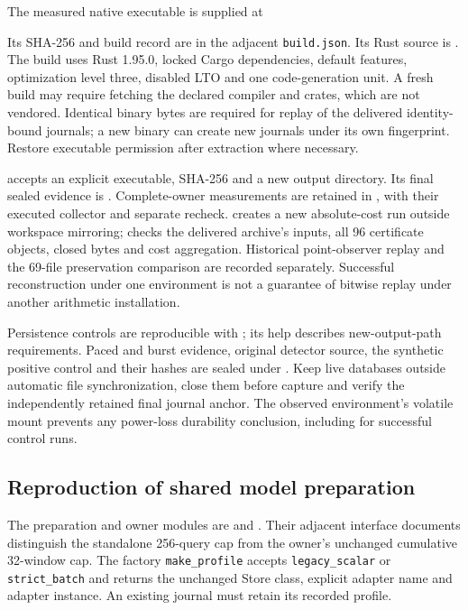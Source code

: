 \documentclass[11pt,a4paper]{article}
\theoremstyle{definition}\newtheorem{definition}[theorem]{Definition}
\begin{document}
The measured native executable is supplied at
\begin{quote}\raggedright\footnotesize
{}
\end{quote}
Its SHA-256 and build record are in the adjacent \texttt{build.json}. Its Rust source is . The build uses Rust 1.95.0, locked Cargo dependencies, default features, optimization level three, disabled LTO and one code-generation unit. A fresh build may require fetching the declared compiler and crates, which are not vendored. Identical binary bytes are required for replay of the delivered identity-bound journals; a new binary can create new journals under its own fingerprint. Restore executable permission after extraction where necessary.

 accepts an explicit executable, SHA-256 and a new output directory. Its final sealed evidence is . Complete-owner measurements are retained in , with their executed collector and separate recheck.  creates a new absolute-cost run outside workspace mirroring;  checks the delivered archive's inputs, all 96 certificate objects, closed bytes and cost aggregation. Historical point-observer replay and the 69-file preservation comparison are recorded separately. Successful reconstruction under one environment is not a guarantee of bitwise replay under another arithmetic installation.

Persistence controls are reproducible with ; its help describes new-output-path requirements. Paced and burst evidence, original detector source, the synthetic positive control and their hashes are sealed under . Keep live databases outside automatic file synchronization, close them before capture and verify the independently retained final journal anchor. The observed environment's volatile mount prevents any power-loss durability conclusion, including for successful control runs.

\subsection{Reproduction of shared model preparation}\label{sec:batchreproduction}
The preparation and owner modules are  and . Their adjacent interface documents distinguish the standalone 256-query cap from the owner's unchanged cumulative 32-window cap. The factory \texttt{make\_profile} accepts \texttt{legacy\_scalar} or \texttt{strict\_batch} and returns the unchanged Store class, explicit adapter name and adapter instance. An existing journal must retain its recorded profile.
\end{document}
